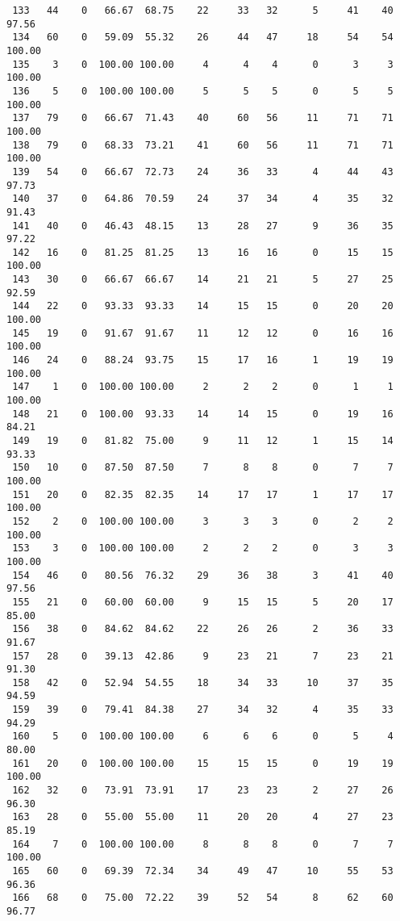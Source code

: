\begin{verbatim}
 133   44    0   66.67  68.75    22     33   32      5     41    40    97.56
 134   60    0   59.09  55.32    26     44   47     18     54    54   100.00
 135    3    0  100.00 100.00     4      4    4      0      3     3   100.00
 136    5    0  100.00 100.00     5      5    5      0      5     5   100.00
 137   79    0   66.67  71.43    40     60   56     11     71    71   100.00
 138   79    0   68.33  73.21    41     60   56     11     71    71   100.00
 139   54    0   66.67  72.73    24     36   33      4     44    43    97.73
 140   37    0   64.86  70.59    24     37   34      4     35    32    91.43
 141   40    0   46.43  48.15    13     28   27      9     36    35    97.22
 142   16    0   81.25  81.25    13     16   16      0     15    15   100.00
 143   30    0   66.67  66.67    14     21   21      5     27    25    92.59
 144   22    0   93.33  93.33    14     15   15      0     20    20   100.00
 145   19    0   91.67  91.67    11     12   12      0     16    16   100.00
 146   24    0   88.24  93.75    15     17   16      1     19    19   100.00
 147    1    0  100.00 100.00     2      2    2      0      1     1   100.00
 148   21    0  100.00  93.33    14     14   15      0     19    16    84.21
 149   19    0   81.82  75.00     9     11   12      1     15    14    93.33
 150   10    0   87.50  87.50     7      8    8      0      7     7   100.00
 151   20    0   82.35  82.35    14     17   17      1     17    17   100.00
 152    2    0  100.00 100.00     3      3    3      0      2     2   100.00
 153    3    0  100.00 100.00     2      2    2      0      3     3   100.00
 154   46    0   80.56  76.32    29     36   38      3     41    40    97.56
 155   21    0   60.00  60.00     9     15   15      5     20    17    85.00
 156   38    0   84.62  84.62    22     26   26      2     36    33    91.67
 157   28    0   39.13  42.86     9     23   21      7     23    21    91.30
 158   42    0   52.94  54.55    18     34   33     10     37    35    94.59
 159   39    0   79.41  84.38    27     34   32      4     35    33    94.29
 160    5    0  100.00 100.00     6      6    6      0      5     4    80.00
 161   20    0  100.00 100.00    15     15   15      0     19    19   100.00
 162   32    0   73.91  73.91    17     23   23      2     27    26    96.30
 163   28    0   55.00  55.00    11     20   20      4     27    23    85.19
 164    7    0  100.00 100.00     8      8    8      0      7     7   100.00
 165   60    0   69.39  72.34    34     49   47     10     55    53    96.36
 166   68    0   75.00  72.22    39     52   54      8     62    60    96.77

\end{verbatim}
